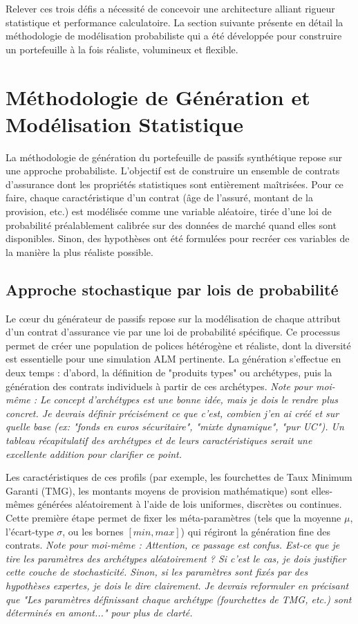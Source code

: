 Relever ces trois défis a nécessité de concevoir une architecture alliant rigueur statistique et performance calculatoire. La section suivante présente en détail la méthodologie de modélisation probabiliste qui a été développée pour construire un portefeuille à la fois réaliste, volumineux et flexible.

\section{Méthodologie de Génération et Modélisation Statistique}

La méthodologie de génération du portefeuille de passifs synthétique repose sur une approche probabiliste. L'objectif est de construire un ensemble de contrats d'assurance dont les propriétés statistiques sont entièrement maîtrisées. Pour ce faire, chaque caractéristique d'un contrat (âge de l'assuré, montant de la provision, etc.) est modélisée comme une variable aléatoire, tirée d'une loi de probabilité préalablement calibrée sur des données de marché quand elles sont disponibles. Sinon, des hypothèses ont été formulées pour recréer ces variables de la manière la plus réaliste possible.


\subsection{Approche stochastique par lois de probabilité}

Le cœur du générateur de passifs repose sur la modélisation de chaque attribut d'un contrat d'assurance vie par une loi de probabilité spécifique. Ce processus permet de créer une population de polices hétérogène et réaliste, dont la diversité est essentielle pour une simulation ALM pertinente. La génération s'effectue en deux temps : d'abord, la définition de "produits types" ou archétypes, puis la génération des contrats individuels à partir de ces archétypes. \textit{Note pour moi-même : Le concept d'archétypes est une bonne idée, mais je dois le rendre plus concret. Je devrais définir précisément ce que c'est, combien j'en ai créé et sur quelle base (ex: "fonds en euros sécuritaire", "mixte dynamique", "pur UC"). Un tableau récapitulatif des archétypes et de leurs caractéristiques serait une excellente addition pour clarifier ce point.}

Les caractéristiques de ces profils (par exemple, les fourchettes de Taux Minimum Garanti (TMG), les montants moyens de provision mathématique) sont elles-mêmes générées aléatoirement à l'aide de lois uniformes, discrètes ou continues. Cette première étape permet de fixer les méta-paramètres (tels que la moyenne $\mu$, l'écart-type $\sigma$, ou les bornes $[min, max]$) qui régiront la génération fine des contrats. \textit{Note pour moi-même : Attention, ce passage est confus. Est-ce que je tire les paramètres des archétypes aléatoirement ? Si c'est le cas, je dois justifier cette couche de stochasticité. Sinon, si les paramètres sont fixés par des hypothèses expertes, je dois le dire clairement. Je devrais reformuler en précisant que "Les paramètres définissant chaque archétype (fourchettes de TMG, etc.) sont déterminés en amont..." pour plus de clarté.}

